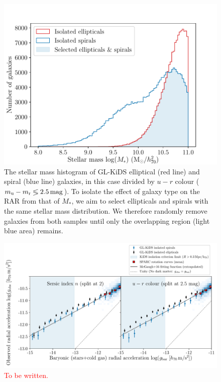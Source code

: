 \documentclass[usenatbib]{mnras}
\newcommand{\magn}{\, {\rm mag} }
\newcommand{\un}[1]{_{\rm #1}}
\begin{document}
\begin{figure}
	\includegraphics[width=\columnwidth]{Figures/mass_range_selection_offsetx0.pdf}
	\caption{The stellar mass histogram of GL-KiDS elliptical (red line) and spiral (blue line) galaxies, in this case divided by $u-r$ colour ($m\un{u} - m\un{r} \lessgtr 2.5 \magn$). To isolate the effect of galaxy type on the RAR from that of $M_*$, we aim to select ellipticals and spirals with the same stellar mass distribution. We therefore randomly remove galaxies from both samples until only the overlapping region (light blue area) remains.}
	\label{fig:galtypes_masshist}
\end{figure}


\begin{figure}
	\includegraphics[width=\textwidth]{Figures/RAR_KiDS_galtypes-sersic_isolated_samemass.pdf}
	\caption{\textcolor{red}{To be written.}}
	\label{fig:RAR_kids_galtypebins}
\end{figure}
\end{document}
